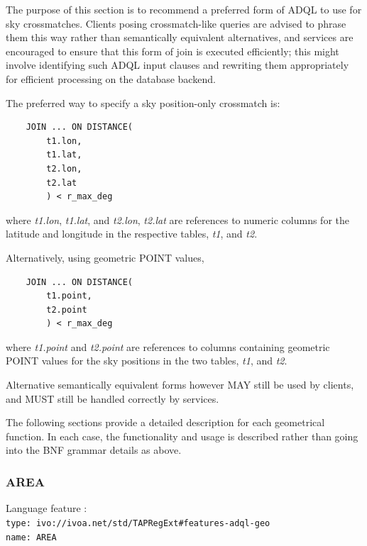 \documentclass[11pt,a4paper]{ivoa}
\begin{document}
The purpose of this section is to recommend a preferred form of ADQL
to use for sky crossmatches.  Clients posing crossmatch-like
queries are advised to phrase them this way rather than semantically
equivalent alternatives, and services are encouraged to ensure that
this form of join is executed efficiently; this might involve 
identifying such ADQL input clauses and rewriting them appropriately 
for efficient processing on the database backend.

The preferred way to specify a sky position-only crossmatch is:
\begin{verbatim}
    JOIN ... ON DISTANCE(
        t1.lon,
        t1.lat,
        t2.lon,
        t2.lat
        ) < r_max_deg
\end{verbatim}
where \textit{t1.lon}, \textit{t1.lat}, and \textit{t2.lon}, \textit{t2.lat}
are references to numeric columns for the latitude and longitude
in the respective tables, \textit{t1}, and \textit{t2}.

Alternatively, using geometric POINT values,
\begin{verbatim}
    JOIN ... ON DISTANCE(
        t1.point,
        t2.point
        ) < r_max_deg
\end{verbatim}
where \textit{t1.point} and \textit{t2.point}
are references to columns containing geometric POINT values
for the sky positions in the two tables, \textit{t1}, and \textit{t2}.

Alternative semantically equivalent forms however MAY still be
used by clients, and MUST still be handled correctly by services.

\clearpage
\label{sec:functions.geom.definitions}

The following sections provide a detailed description for each geometrical
function. In each case, the functionality and usage is described rather
than going into the BNF grammar details as above.

\subsubsection{AREA}
\label{sec:functions.geom.area}
{\footnotesize Language feature :}\\
{\footnotesize \verb|type: ivo://ivoa.net/std/TAPRegExt#features-adql-geo|}\\
{\footnotesize \verb|name: AREA|}\\
\end{document}
